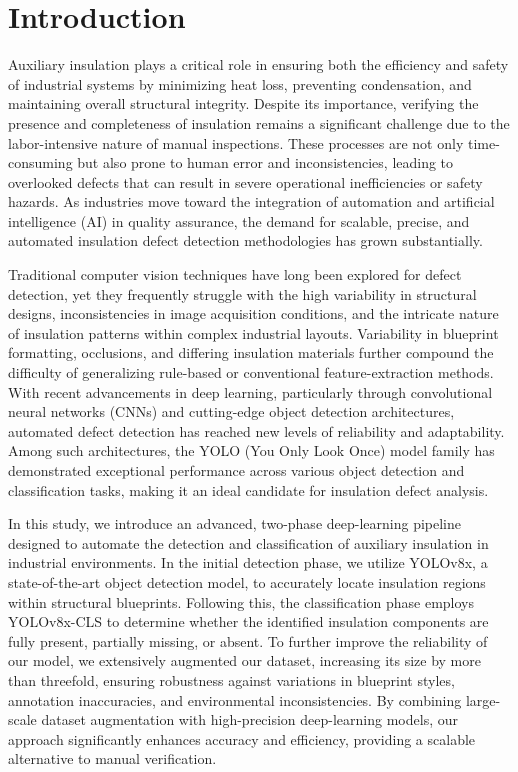 \documentclass[]{IEEEphot}
\begin{document}
\section{Introduction}
\hspace*{1em}Auxiliary insulation plays a critical role in ensuring both the efficiency and safety of industrial systems by minimizing heat loss, preventing condensation, and maintaining overall structural integrity. Despite its importance, verifying the presence and completeness of insulation remains a significant challenge due to the labor-intensive nature of manual inspections. These processes are not only time-consuming but also prone to human error and inconsistencies, leading to overlooked defects that can result in severe operational inefficiencies or safety hazards. As industries move toward the integration of automation and artificial intelligence (AI) in quality assurance, the demand for scalable, precise, and automated insulation defect detection methodologies has grown substantially.

Traditional computer vision techniques have long been explored for defect detection, yet they frequently struggle with the high variability in structural designs, inconsistencies in image acquisition conditions, and the intricate nature of insulation patterns within complex industrial layouts. Variability in blueprint formatting, occlusions, and differing insulation materials further compound the difficulty of generalizing rule-based or conventional feature-extraction methods. With recent advancements in deep learning, particularly through convolutional neural networks (CNNs) and cutting-edge object detection architectures, automated defect detection has reached new levels of reliability and adaptability. Among such architectures, the YOLO (You Only Look Once) model family has demonstrated exceptional performance across various object detection and classification tasks, making it an ideal candidate for insulation defect analysis.

In this study, we introduce an advanced, two-phase deep-learning pipeline designed to automate the detection and classification of auxiliary insulation in industrial environments. In the initial detection phase, we utilize YOLOv8x, a state-of-the-art object detection model, to accurately locate insulation regions within structural blueprints. Following this, the classification phase employs YOLOv8x-CLS to determine whether the identified insulation components are fully present, partially missing, or absent. To further improve the reliability of our model, we extensively augmented our dataset, increasing its size by more than threefold, ensuring robustness against variations in blueprint styles, annotation inaccuracies, and environmental inconsistencies. By combining large-scale dataset augmentation with high-precision deep-learning models, our approach significantly enhances accuracy and efficiency, providing a scalable alternative to manual verification.
\end{document}
